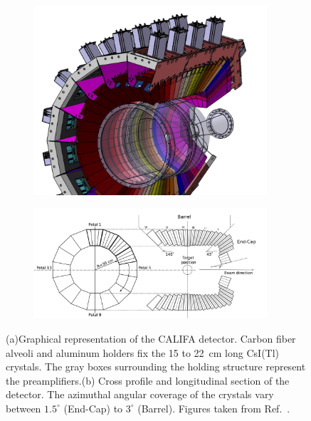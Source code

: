\documentclass[review,sort&compress]{elsarticle}
\begin{document}
\begin{figure}
\centering
\begin{subfigure}{.5\textwidth}
  \centering
  \includegraphics[width=0.95\textwidth]{califa_drawing.png}
  \caption{}
  \label{fig:sub1}
\end{subfigure}%
\begin{subfigure}{.5\textwidth}
  \centering
  \includegraphics[width=0.95\textwidth]{califa_drawing_side.png}
  \caption{}
  \label{fig:sub2}
\end{subfigure}
\caption{(a)Graphical representation of the CALIFA detector. Carbon fiber alveoli and aluminum holders fix the 15 to 22~cm long CsI(Tl) crystals. The gray boxes surrounding the holding structure represent the preamplifiers.(b) Cross profile and longitudinal section of the detector. The azimuthal angular coverage of the crystals vary between $1.5^\circ$ (End-Cap) to $3^\circ$ (Barrel). Figures taken from Ref.~\cite{cabanelas2020commissioning}.}
\label{fig:califa_setup}
\end{figure}
\end{document}
